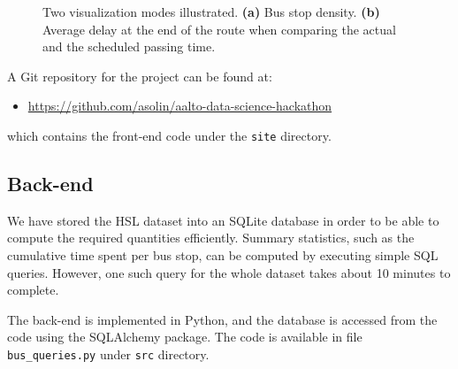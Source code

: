 \documentclass[a4paper,12pt]{article}
\begin{document}
\begin{figure}
\centering     %
{}
\caption{Two visualization modes illustrated. \textbf{(a)} Bus stop density. 
\textbf{(b)} Average delay at the end of the route when comparing the actual 
and the scheduled passing time.}
\label{fig:modes}
\end{figure}

A Git repository for the project can be found at:
\begin{itemize}
\item[] \url{https://github.com/asolin/aalto-data-science-hackathon}
\end{itemize}
which contains the front-end code under the \texttt{site} directory.

\subsection{Back-end}

We have stored the HSL dataset into an SQLite database in order to be 
able to compute the required quantities efficiently. Summary statistics, such 
as the cumulative time spent per bus stop, can be computed by executing simple 
SQL queries. However, one such query for the whole dataset takes about 10 
minutes to complete.

The back-end is implemented in Python, and the database is accessed from the 
code using the SQLAlchemy package. The code is available in file 
\mbox{\texttt{bus\_queries.py}} under \texttt{src} directory.
\end{document}
